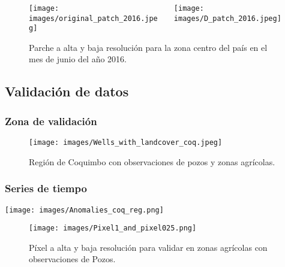 \documentclass{beamer}
\begin{document}
  \begin{frame}
    \frametitle{}
    
    \begin{figure}
      \begin{columns}
        \begin{column}{0.5\textwidth}
          \texttt{[image: images/original\_patch\_2016.jpeg]}
        \end{column}

        \begin{column}{0.5\textwidth}
          \texttt{[image: images/D\_patch\_2016.jpeg]}
        \end{column}
      \end{columns}
      \caption{Parche a alta y baja resolución para la zona centro del país en el mes de junio del año 2016.}
    \end{figure}
  \end{frame}

  \subsection*{Validación de datos}

  \begin{frame}
    \frametitle{Zona de validación}
    \begin{figure}
      \centering
      \texttt{[image: images/Wells\_with\_landcover\_coq.jpeg]}
      \caption{Región de Coquimbo con observaciones de pozos y zonas agrícolas.}
    \end{figure}

  \end{frame}

  \begin{frame}
    \frametitle{Series de tiempo}
    
    \centering
    \texttt{[image: images/Anomalies\_coq\_reg.png]}
  
  \end{frame}

  \begin{frame}
    \begin{figure}
      \centering
      \texttt{[image: images/Pixel1\_and\_pixel025.png]}
      \caption{Píxel a alta y baja resolución para validar en zonas agrícolas con observaciones de Pozos.}
    \end{figure}
  \end{frame}
\end{document}
